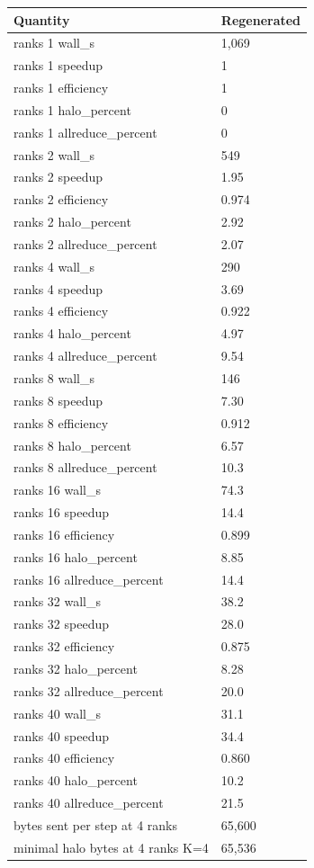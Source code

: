 \begin{tabular}{ll}
Quantity & Regenerated \\
\hline
ranks 1 wall\_s & 1,069 \\
ranks 1 speedup & 1 \\
ranks 1 efficiency & 1 \\
ranks 1 halo\_percent & 0 \\
ranks 1 allreduce\_percent & 0 \\
ranks 2 wall\_s & 549 \\
ranks 2 speedup & 1.95 \\
ranks 2 efficiency & 0.974 \\
ranks 2 halo\_percent & 2.92 \\
ranks 2 allreduce\_percent & 2.07 \\
ranks 4 wall\_s & 290 \\
ranks 4 speedup & 3.69 \\
ranks 4 efficiency & 0.922 \\
ranks 4 halo\_percent & 4.97 \\
ranks 4 allreduce\_percent & 9.54 \\
ranks 8 wall\_s & 146 \\
ranks 8 speedup & 7.30 \\
ranks 8 efficiency & 0.912 \\
ranks 8 halo\_percent & 6.57 \\
ranks 8 allreduce\_percent & 10.3 \\
ranks 16 wall\_s & 74.3 \\
ranks 16 speedup & 14.4 \\
ranks 16 efficiency & 0.899 \\
ranks 16 halo\_percent & 8.85 \\
ranks 16 allreduce\_percent & 14.4 \\
ranks 32 wall\_s & 38.2 \\
ranks 32 speedup & 28.0 \\
ranks 32 efficiency & 0.875 \\
ranks 32 halo\_percent & 8.28 \\
ranks 32 allreduce\_percent & 20.0 \\
ranks 40 wall\_s & 31.1 \\
ranks 40 speedup & 34.4 \\
ranks 40 efficiency & 0.860 \\
ranks 40 halo\_percent & 10.2 \\
ranks 40 allreduce\_percent & 21.5 \\
bytes sent per step at 4 ranks & 65,600 \\
minimal halo bytes at 4 ranks K=4 & 65,536 \\
\end{tabular}
